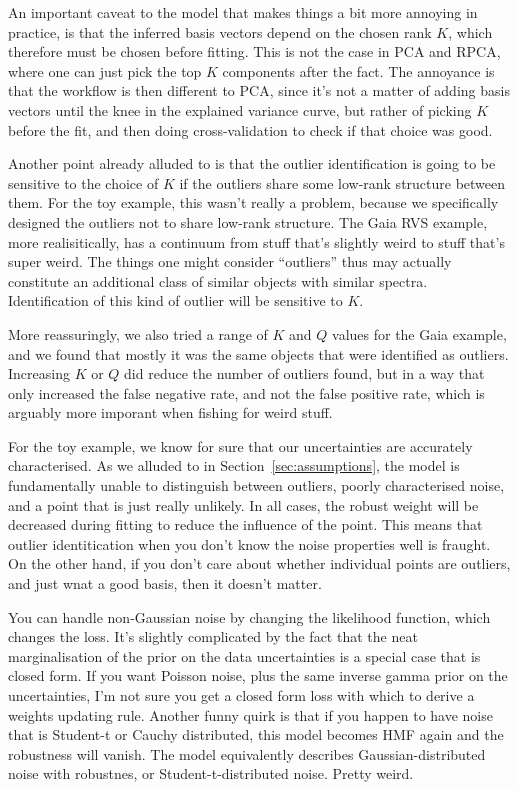 \documentclass[onecolumn,floatfix]{aastex631}
\begin{document}
An important caveat to the model that makes things a bit more annoying in practice, is that the inferred basis vectors depend on the chosen rank $K$, which therefore must be chosen before fitting.
This is not the case in PCA and RPCA, where one can just pick the top $K$ components after the fact.
The annoyance is that the workflow is then different to PCA, since it's not a matter of adding basis vectors until the knee in the explained variance curve, but rather of picking $K$ before the fit, and then doing cross-validation to check if that choice was good.

Another point already alluded to is that the outlier identification is going to be sensitive to the choice of $K$ if the outliers share some low-rank structure between them.
For the toy example, this wasn't really a problem, because we specifically designed the outliers not to share low-rank structure.
The Gaia RVS example, more realisitically, has a continuum from stuff that's slightly weird to stuff that's super weird.
The things one might consider ``outliers'' thus may actually constitute an additional class of similar objects with similar spectra.
Identification of this kind of outlier will be sensitive to $K$.

More reassuringly, we also tried a range of $K$ and $Q$ values for the Gaia example, and we found that mostly it was the same objects that were identified as outliers.
Increasing $K$ or $Q$ did reduce the number of outliers found, but in a way that only increased the false negative rate, and not the false positive rate, which is arguably more imporant when fishing for weird stuff.

For the toy example, we know for sure that our uncertainties are accurately characterised.
As we alluded to in Section~\ref{sec:assumptions}, the model is fundamentally unable to distinguish between outliers, poorly characterised noise, and a point that is just really unlikely.
In all cases, the robust weight will be decreased during fitting to reduce the influence of the point.
This means that outlier identitication when you don't know the noise properties well is fraught.
On the other hand, if you don't care about whether individual points are outliers, and just wnat a good basis, then it doesn't matter.


You can handle non-Gaussian noise by changing the likelihood function, which changes the loss.
It's slightly complicated by the fact that the neat marginalisation of the prior on the data uncertainties is a special case that is closed form.
If you want Poisson noise, plus the same inverse gamma prior on the uncertainties, I'm not sure you get a closed form loss with which to derive a weights updating rule.
Another funny quirk is that if you happen to have noise that is Student-t or Cauchy distributed, this model becomes HMF again and the robustness will vanish.
The model equivalently describes Gaussian-distributed noise with robustnes, or Student-t-distributed noise.
Pretty weird.
\end{document}
